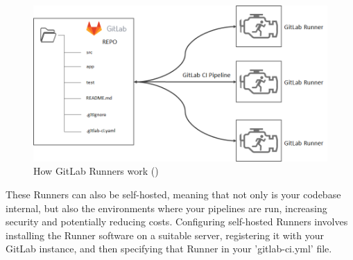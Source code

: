 \begin{figure}[H]
	\centering
	\includegraphics[width=14cm]{images/gitlab_runners.png}
	\caption{How GitLab Runners work (\cite{refGitLabRunners})}
	\label{fig:gitlab_runners}
\end{figure}

These Runners can also be self-hosted, meaning that not only is your codebase internal, but also the environments where your pipelines are run, increasing security and potentially reducing costs.
Configuring self-hosted Runners involves installing the Runner software on a suitable server, registering it with your GitLab instance, and then specifying that Runner in your 'gitlab-ci.yml' file.
